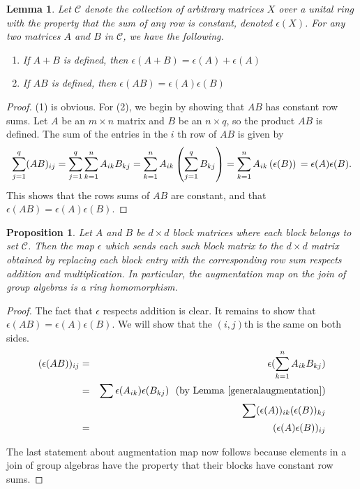 \documentclass[12pt, a4paper]{amsart}
\numberwithin{equation}{section} %
\theoremstyle{plain}
\theoremstyle{definition}
\theoremstyle{plain}
\newtheorem{prop}[thm]{Proposition}
\newtheorem{lem}[thm]{Lemma}
\theoremstyle{remark}
\begin{document}
\begin{lem} \label{generalaugmentation}
Let $\mathcal{C}$ denote the collection of arbitrary  matrices $X$ over a unital ring with the property that the sum of any row  is constant, denoted $\epsilon(X)$. For any two matrices $A$ and $B$ in $\mathcal{C}$, we have the following. 
\begin{enumerate}
    \item If $A+B$ is defined, then  $\epsilon(A+B) = \epsilon(A)+ \epsilon(A)$\\
    \item If $AB$ is defined, then $\epsilon(AB) = \epsilon(A)\epsilon(B)$
\end{enumerate}
\end{lem}

\begin{proof}
(1) is obvious. For (2), we begin by showing that $AB$ has constant row sums. Let $A$ be an $m \times n$ matrix and $B$ be an $n \times q$, so the product $AB$ is defined. The sum of the entries in the $i$ th row of $AB$ is given by
\[
 \sum_{j = 1}^q (AB)_{ij} 
  =  \sum_{j=1}^q \sum_{k=1}^n A_{ik}B_{kj}
  =  \sum_{k=1}^n A_{ik}\left( \sum_{j=1}^q B_{kj} \right)
  =\sum_{k=1}^n A_{ik}\left( \epsilon(B) \right)\\
 = \epsilon(A) \epsilon(B).
\]
This shows that the rows sums of $AB$ are constant, and  that $\epsilon(AB) =\epsilon(A)\epsilon(B)$.
\end{proof}

\begin{prop}
Let $A$ and $B$ be $d \times d$ block matrices where each block belongs to set $\mathcal{C}$. Then the map $\epsilon$ which sends each such block matrix to the $d \times d$ matrix obtained by replacing each block entry with the corresponding row sum respects addition and multiplication. In particular, the augmentation map on the join of group algebras is a ring homomorphism.
\end{prop}

\begin{proof}
The fact that $\epsilon$ respects addition is clear. It remains to show that $\epsilon(AB) = \epsilon(A) \epsilon(B)$.  We will show that the $(i, j)$th is the same on both sides.
\begin{eqnarray*}
(\epsilon(AB))_{ij} & = &  \epsilon( \sum_{k=1}^n A_{ik} B_{kj})\\
& = & \sum \epsilon(A_{ik}) \epsilon(B_{kj})  \ \ \text{(by  Lemma \ref{generalaugmentation})}\\ 
& & \sum (\epsilon(A))_{ik} (\epsilon(B))_{kj} \\
& = & (\epsilon(A) \epsilon(B))_{ij}
\end{eqnarray*}

The last statement about augmentation map now follows because elements in a join of group algebras have the property that their blocks have constant row sums.
\end{proof}
\end{document}
